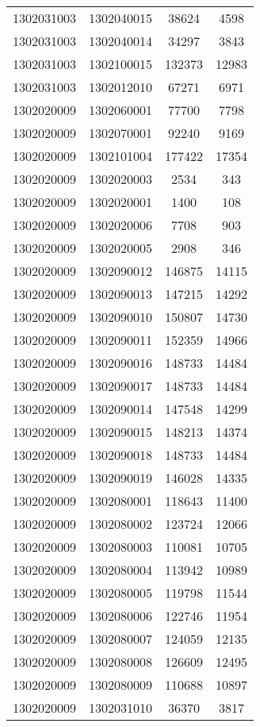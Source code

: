 \begin{longtable}[h]{llcc}
		1302031003 & 1302040015 & 38624 & 4598\\
		1302031003 & 1302040014 & 34297 & 3843\\
		1302031003 & 1302100015 & 132373 & 12983\\
		1302031003 & 1302012010 & 67271 & 6971\\
		1302020009 & 1302060001 & 77700 & 7798\\
		1302020009 & 1302070001 & 92240 & 9169\\
		1302020009 & 1302101004 & 177422 & 17354\\
		1302020009 & 1302020003 & 2534 & 343\\
		1302020009 & 1302020001 & 1400 & 108\\
		1302020009 & 1302020006 & 7708 & 903\\
		1302020009 & 1302020005 & 2908 & 346\\
		1302020009 & 1302090012 & 146875 & 14115\\
		1302020009 & 1302090013 & 147215 & 14292\\
		1302020009 & 1302090010 & 150807 & 14730\\
		1302020009 & 1302090011 & 152359 & 14966\\
		1302020009 & 1302090016 & 148733 & 14484\\
		1302020009 & 1302090017 & 148733 & 14484\\
		1302020009 & 1302090014 & 147548 & 14299\\
		1302020009 & 1302090015 & 148213 & 14374\\
		1302020009 & 1302090018 & 148733 & 14484\\
		1302020009 & 1302090019 & 146028 & 14335\\
		1302020009 & 1302080001 & 118643 & 11400\\
		1302020009 & 1302080002 & 123724 & 12066\\
		1302020009 & 1302080003 & 110081 & 10705\\
		1302020009 & 1302080004 & 113942 & 10989\\
		1302020009 & 1302080005 & 119798 & 11544\\
		1302020009 & 1302080006 & 122746 & 11954\\
		1302020009 & 1302080007 & 124059 & 12135\\
		1302020009 & 1302080008 & 126609 & 12495\\
		1302020009 & 1302080009 & 110688 & 10897\\
		1302020009 & 1302031010 & 36370 & 3817\\

\end{longtable}

